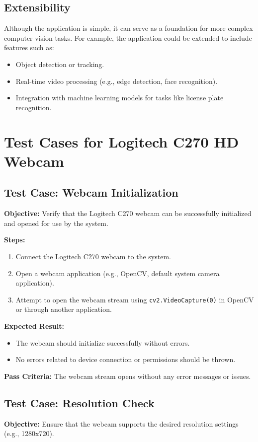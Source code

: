 \subsection*{Extensibility}
Although the application is simple, it can serve as a foundation for more complex computer vision tasks. For example, the application could be extended to include features such as:
\begin{itemize}
	\item Object detection or tracking.
	\item Real-time video processing (e.g., edge detection, face recognition).
	\item Integration with machine learning models for tasks like license plate recognition. \cite{Rosebrock:2016}
	
\end{itemize}

\section{Test Cases for Logitech C270 HD Webcam}
\subsection{Test Case: Webcam Initialization}
\textbf{Objective:} Verify that the Logitech C270 webcam can be successfully initialized and opened for use by the system.

\textbf{Steps:}
\begin{enumerate}
	\item Connect the Logitech C270 webcam to the system.
	\item Open a webcam application (e.g., OpenCV, default system camera application).
	\item Attempt to open the webcam stream using \texttt{cv2.VideoCapture(0)} in OpenCV or through another application.
\end{enumerate}

\textbf{Expected Result:}
\begin{itemize}
	\item The webcam should initialize successfully without errors.
	\item No errors related to device connection or permissions should be thrown.
\end{itemize}

\textbf{Pass Criteria:} 
The webcam stream opens without any error messages or issues.

\subsection{Test Case: Resolution Check}
\textbf{Objective:} Ensure that the webcam supports the desired resolution settings (e.g., 1280x720).


